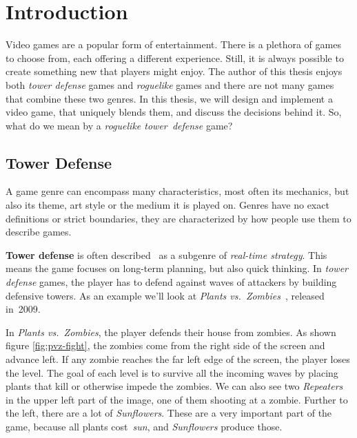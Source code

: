 \chapter{Introduction}

Video games are a popular form of entertainment.
There is a plethora of games to choose from, each offering a different experience.
Still, it is always possible to create something new that players might enjoy.
The author of this thesis enjoys both \emph{tower defense} games and \emph{roguelike} games and there are not many games that combine these two genres.
In this thesis, we will design and implement a video game, that uniquely blends them, and discuss the decisions behind it.
So, what do we mean by a \emph{roguelike tower~defense} game?

\section{Tower Defense}

A game genre can encompass many characteristics, most often its mechanics, but also its theme, art style or the medium it is played on.
Genres have no exact definitions or strict boundaries, they are characterized by how people use them to describe games.

\textbf{Tower defense} is often described~\cite{TDWiki}\cite{CITD} as a subgenre of \emph{real-time strategy}.
This means the game focuses on long-term planning, but also quick thinking.
In \emph{tower defense} games, the player has to defend against waves of attackers by building defensive towers.
As an example we'll look at \emph{Plants vs.\ Zombies}~\cite{PvZWiki}, released in~2009.

In \emph{Plants vs.\ Zombies}, the player defends their house from zombies.
As shown figure \ref{fig:pvz-fight}, the zombies come from the right side of the screen and advance left.
If any zombie reaches the far left edge of the screen, the player loses the level.
The goal of each level is to survive all the incoming waves by placing plants that kill or otherwise impede the zombies.
We can also see two \emph{Repeaters} in the upper left part of the image, one of them shooting at a zombie.
Further to the left, there are a lot of \emph{Sunflowers}.
These are a very important part of the game, because all plants cost~\emph{sun}, and \emph{Sunflowers} produce those.


